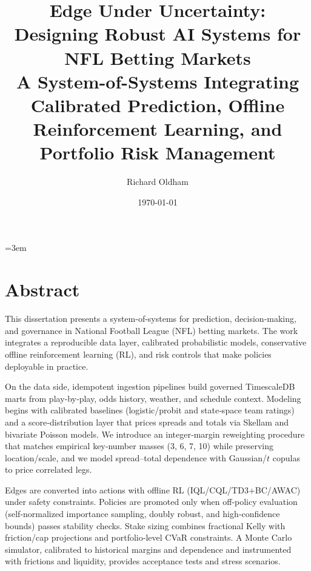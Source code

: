 \documentclass[12pt]{report}  %
\numberwithin{equation}{section}
\theoremstyle{plain}
\theoremstyle{definition}
\theoremstyle{remark}
\providecommand{\frontmatter}{\pagenumbering{roman}}
\begin{document}
\singlespacing  %
\emergencystretch=3em %

\frontmatter

\title{Edge Under Uncertainty: Designing Robust AI Systems for NFL Betting Markets%
\\[0.5em]%
\large A System-of-Systems Integrating Calibrated Prediction, Offline Reinforcement Learning, and Portfolio Risk Management}            %
\author{Richard Oldham}                    %
\date{\today}                           %
\hypersetup{pageanchor=false}
\maketitle

\chapter*{Abstract}
This dissertation presents a system-of-systems for prediction, decision‑making, and governance in National Football League (NFL) betting markets. The work integrates a reproducible data layer, calibrated probabilistic models, conservative offline reinforcement learning (RL), and risk controls that make policies deployable in practice.

On the data side, idempotent ingestion pipelines build governed TimescaleDB marts from play‑by‑play, odds history, weather, and schedule context. Modeling begins with calibrated baselines (logistic/probit and state‑space team ratings) and a score‑distribution layer that prices spreads and totals via Skellam and bivariate Poisson models. We introduce an integer‑margin reweighting procedure that matches empirical key‑number masses (3, 6, 7, 10) while preserving location/scale, and we model spread–total dependence with Gaussian/$t$ copulas to price correlated legs.

Edges are converted into actions with offline RL (IQL/CQL/TD3+BC/AWAC) under safety constraints. Policies are promoted only when off‑policy evaluation (self‑normalized importance sampling, doubly robust, and high‑confidence bounds) passes stability checks. Stake sizing combines fractional Kelly with friction/cap projections and portfolio‑level CVaR constraints. A Monte Carlo simulator, calibrated to historical margins and dependence and instrumented with frictions and liquidity, provides acceptance tests and stress scenarios.
\end{document}
